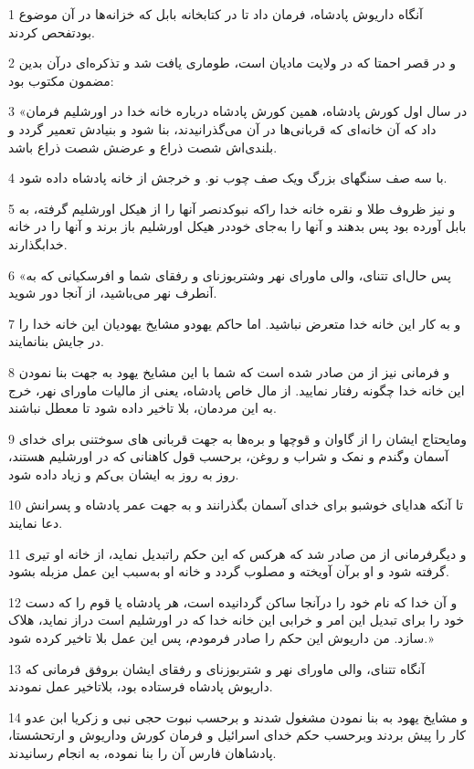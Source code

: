 \par 1 آنگاه داریوش پادشاه، فرمان داد تا در کتابخانه بابل که خزانه‌ها در آن موضوع بودتفحص کردند.
\par 2 و در قصر احمتا که در ولایت مادیان است، طوماری یافت شد و تذکره‌ای درآن بدین مضمون مکتوب بود:
\par 3 «در سال اول کورش پادشاه، همین کورش پادشاه درباره خانه خدا در اورشلیم فرمان داد که آن خانه‌ای که قربانی‌ها در آن می‌گذرانیدند، بنا شود و بنیادش تعمیر گردد و بلندی‌اش شصت ذراع و عرضش شصت ذراع باشد.
\par 4 با سه صف سنگهای بزرگ ویک صف چوب نو. و خرجش از خانه پادشاه داده شود.
\par 5 و نیز ظروف طلا و نقره خانه خدا راکه نبوکدنصر آنها را از هیکل اورشلیم گرفته، به بابل آورده بود پس بدهند و آنها را به‌جای خوددر هیکل اورشلیم باز برند و آنها را در خانه خدابگذارند.
\par 6 «پس حال‌ای تتنای، والی ماورای نهر وشتربوزنای و رفقای شما و افرسکیانی که به آنطرف نهر می‌باشید، از آنجا دور شوید.
\par 7 و به کار این خانه خدا متعرض نباشید. اما حاکم یهودو مشایخ یهودیان این خانه خدا را در جایش بنانمایند.
\par 8 و فرمانی نیز از من صادر شده است که شما با این مشایخ یهود به جهت بنا نمودن این خانه خدا چگونه رفتار نمایید. از مال خاص پادشاه، یعنی از مالیات ماورای نهر، خرج به این مردمان، بلا تاخیر داده شود تا معطل نباشند.
\par 9 ومایحتاج ایشان را از گاوان و قوچها و بره‌ها به جهت قربانی های سوختنی برای خدای آسمان وگندم و نمک و شراب و روغن، برحسب قول کاهنانی که در اورشلیم هستند، روز به روز به ایشان بی‌کم و زیاد داده شود.
\par 10 تا آنکه هدایای خوشبو برای خدای آسمان بگذرانند و به جهت عمر پادشاه و پسرانش دعا نمایند.
\par 11 و دیگرفرمانی از من صادر شد که هرکس که این حکم راتبدیل نماید، از خانه او تیری گرفته شود و او برآن آویخته و مصلوب گردد و خانه او به‌سبب این عمل مزبله بشود.
\par 12 و آن خدا که نام خود را درآنجا ساکن گردانیده است، هر پادشاه یا قوم را که دست خود را برای تبدیل این امر و خرابی این خانه خدا که در اورشلیم است دراز نماید، هلاک سازد. من داریوش این حکم را صادر فرمودم، پس این عمل بلا تاخیر کرده شود.»
\par 13 آنگاه تتنای، والی ماورای نهر و شتربوزنای و رفقای ایشان بروفق فرمانی که داریوش پادشاه فرستاده بود، بلاتاخیر عمل نمودند.
\par 14 و مشایخ یهود به بنا نمودن مشغول شدند و برحسب نبوت حجی نبی و زکریا ابن عدو کار را پیش بردند وبرحسب حکم خدای اسرائیل و فرمان کورش وداریوش و ارتحشستا، پادشاهان فارس آن را بنا نموده، به انجام رسانیدند.
